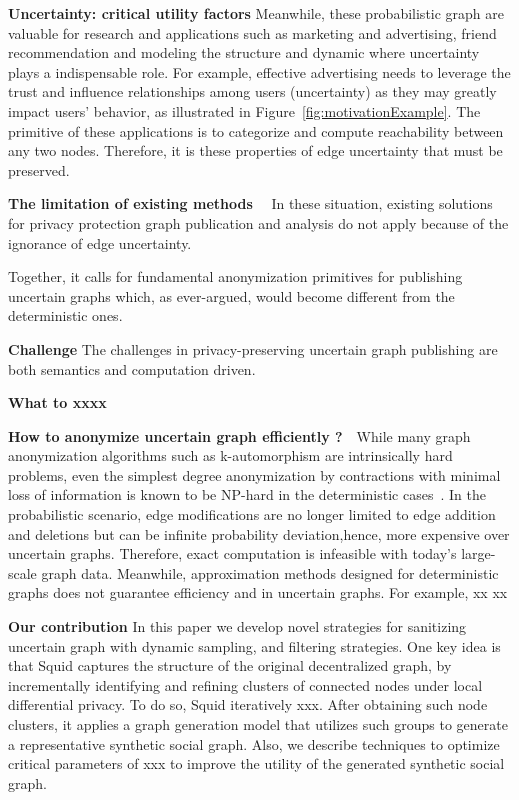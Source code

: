 \textbf{Uncertainty: critical utility factors} Meanwhile, these probabilistic graph are valuable for research and applications such as marketing and advertising, friend recommendation and modeling the structure and dynamic where uncertainty plays a indispensable role. For example, effective advertising needs to leverage the trust and influence relationships among users (uncertainty) as they may greatly impact users' behavior, as illustrated in Figure~\ref{fig:motivationExample}.  The primitive of these applications is to categorize and compute reachability between any two nodes. Therefore, it is these properties of edge uncertainty that must be preserved. 

\textbf{The limitation of existing methods}~~
In these situation, existing solutions for privacy protection graph publication and analysis do not apply because of the ignorance of edge uncertainty. 

Together, it calls for fundamental anonymization primitives for publishing uncertain graphs which, as ever-argued, would become different from the deterministic ones.

\textbf{Challenge} 
The challenges in privacy-preserving uncertain graph publishing are both semantics and computation driven. 

\textbf{What to xxxx}


\textbf{How to anonymize uncertain graph efficiently ?}~~While many graph anonymization algorithms such as k-automorphism are intrinsically hard problems, even the simplest degree anonymization by  contractions with minimal loss of information is known to be NP-hard in the deterministic cases~\cite{}. In the probabilistic scenario, edge modifications are no longer limited to edge addition and deletions but can be infinite probability deviation,hence, more expensive over uncertain graphs. Therefore, exact computation is infeasible with today's large-scale graph data. 
Meanwhile, approximation methods designed for deterministic graphs does not guarantee efficiency and in uncertain graphs. For example, xx xx  

\textbf{Our contribution} In this paper we develop novel strategies for sanitizing uncertain graph with dynamic sampling, and filtering strategies. 
One key idea is that Squid captures the structure
of the original decentralized graph, by incrementally identifying
and refining clusters of connected nodes under local differential
privacy. 
To do so, Squid iteratively xxx.
After obtaining such node clusters, it applies a graph
generation model that utilizes such groups to generate a representative
synthetic social graph. Also, we describe techniques to
optimize critical parameters of xxx to improve the utility of the
generated synthetic social graph.


